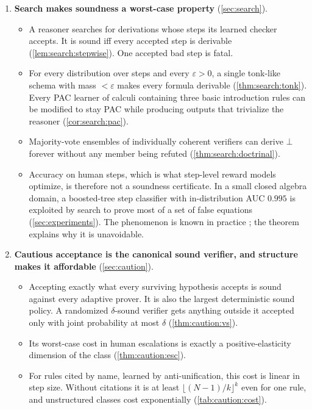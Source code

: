 \begin{enumerate}[label=\textbf{(\arabic*)}]
\item \textbf{Search makes soundness a worst-case property} (\cref{sec:search}).
  \begin{itemize}
  \item A reasoner searches for derivations whose steps its learned checker accepts. It is sound iff every accepted step is derivable (\cref{lem:search:stepwise}). One accepted bad step is fatal.
  \item For every distribution over steps and every $\varepsilon>0$, a single tonk-like schema with mass $<\varepsilon$ makes every formula derivable (\cref{thm:search:tonk}). Every PAC learner of calculi containing three basic introduction rules can be modified to stay PAC while producing outputs that trivialize the reasoner (\cref{cor:search:pac}).
  \item Majority-vote ensembles of individually coherent verifiers can derive $\bot$ forever without any member being refuted (\cref{thm:search:doctrinal}).
  \item Accuracy on human steps, which is what step-level reward models optimize, is therefore not a soundness certificate. In a small closed algebra domain, a boosted-tree step classifier with in-distribution AUC $0.995$ is exploited by search to prove most of a set of false equations (\cref{sec:experiments}). The phenomenon is known in practice \citep{gao2023scaling}; the theorem explains why it is unavoidable.
  \end{itemize}
\item \textbf{Cautious acceptance is the canonical sound verifier, and structure makes it affordable} (\cref{sec:caution}).
  \begin{itemize}
  \item Accepting exactly what every surviving hypothesis accepts is sound against every adaptive prover. It is also the largest deterministic sound policy. A randomized $\delta$-sound verifier gets anything outside it accepted only with joint probability at most $\delta$ (\cref{thm:caution:vs}).
  \item Its worst-case cost in human escalations is exactly a positive-elasticity dimension of the class (\cref{thm:caution:esc}).
  \item For rules cited by name, learned by anti-unification, this cost is linear in step size. Without citations it is at least $\lfloor (N-1)/k\rfloor^k$ even for one rule, and unstructured classes cost exponentially (\cref{tab:caution:cost}).

\end{itemize}
\end{enumerate}
